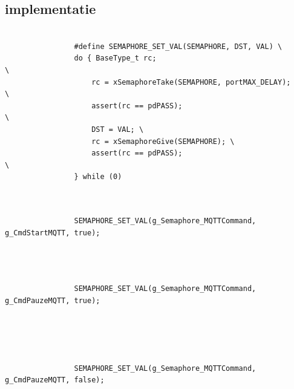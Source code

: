 		\subsection{implementatie}
		
		
		\lstset{language=java}
		
		\begin{Aanpassen}
			\begin{lstlisting}
				
				#define SEMAPHORE_SET_VAL(SEMAPHORE, DST, VAL) \
				do { BaseType_t rc;                                     \
					rc = xSemaphoreTake(SEMAPHORE, portMAX_DELAY);        \
					assert(rc == pdPASS);                                \
					DST = VAL; \
					rc = xSemaphoreGive(SEMAPHORE); \
					assert(rc == pdPASS);                                \
				} while (0)
				
				
			\end{lstlisting}
		\end{Aanpassen}
		
		
		
		\lstset{language=java}
		
		\begin{Aanpassen}
			\begin{lstlisting}
				SEMAPHORE_SET_VAL(g_Semaphore_MQTTCommand, g_CmdStartMQTT, true);
				
				
				
			\end{lstlisting}
		\end{Aanpassen}
		
		
		\lstset{language=java}
		
		\begin{Aanpassen}
			\begin{lstlisting}
				SEMAPHORE_SET_VAL(g_Semaphore_MQTTCommand, g_CmdPauzeMQTT, true);
				
				
				
				
			\end{lstlisting}
		\end{Aanpassen}
		
		
		\lstset{language=java}
		
		\begin{Aanpassen}
			\begin{lstlisting}
				SEMAPHORE_SET_VAL(g_Semaphore_MQTTCommand, g_CmdPauzeMQTT, false);
				
				
				
				
			\end{lstlisting}
		\end{Aanpassen}
		
